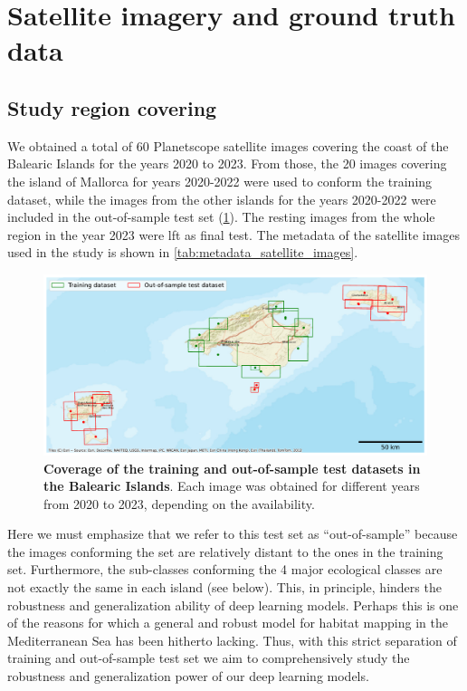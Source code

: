 \section{Satellite imagery and ground truth data}\label{app:satellite_imagery}

\subsection{Study region covering}

We obtained a total of 60 Planetscope satellite images covering the
coast of the Balearic Islands for the years 2020 to 2023. From those, the 20
images covering the island of Mallorca for years 2020-2022 were used to conform
the training
dataset, while the images from the other islands for the years 2020-2022 were
included in the
out-of-sample test set (\cref{fig:images-dataset}). The resting images from the
whole region in the year 2023 were lft as final test. The metadata of the
satellite images used in the study is shown in
\cref{tab:metadata_satellite_images}.

\begin{figure}[H]
    \centering
    \includegraphics[width=\textwidth]{Figures/Images_used.pdf}
    \caption[Coverage of the training and out-of-sample test datasets in
        the Balearic Islands]{\textbf{Coverage of the training and
            out-of-sample
            test datasets in
            the Balearic Islands}. Each image was obtained for different years
        from 2020 to 2023, depending on the availability.}
    \label{fig:images-dataset}
\end{figure}

Here we must emphasize that we refer to this test set as
``out-of-sample'' because the images conforming the set are relatively distant
to the ones in the training set. Furthermore, the sub-classes conforming the 4
major ecological classes are not exactly the same in each island (see below).
This, in principle, hinders the robustness and generalization ability of deep
learning models. Perhaps this is one of the reasons for which a general and
robust model for habitat mapping in the Mediterranean Sea has been hitherto
lacking. Thus, with this strict separation of training and out-of-sample test
set we aim to comprehensively study the robustness and generalization power of
our deep learning models.


